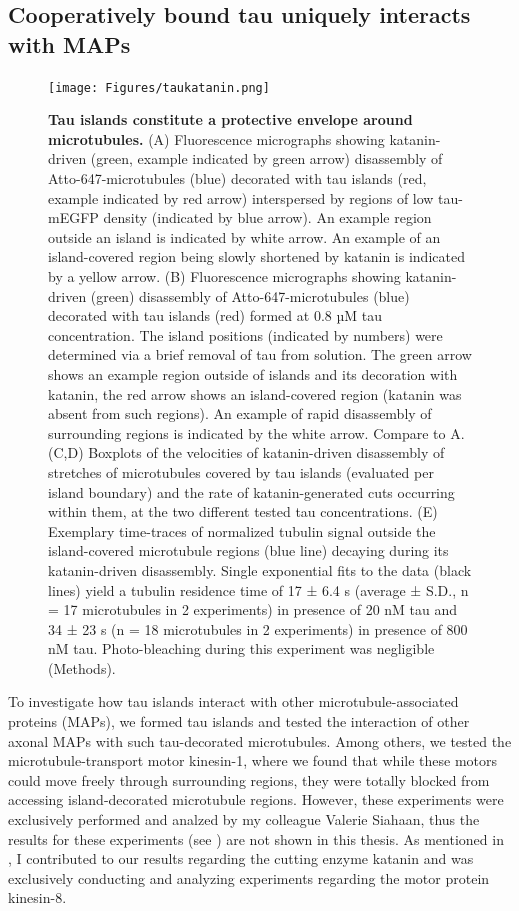 \subsection{Cooperatively bound tau uniquely interacts with MAPs}
\begin{figure}[h!]
\centering
\texttt{[image: Figures/taukatanin.png]}
\caption[Tau islands constitute a protective envelope around microtubules.]{
\textbf{Tau islands constitute a protective envelope around microtubules.} (A) Fluorescence micrographs showing katanin-driven (green, example indicated by green arrow) disassembly of Atto-647-microtubules (blue) decorated with tau islands (red, example indicated by red arrow) interspersed by regions of low tau-mEGFP density (indicated by blue arrow). An example region outside an island is indicated by white arrow. An example of an island-covered region being slowly shortened by katanin is indicated by a yellow arrow. (B) Fluorescence micrographs showing katanin-driven (green) disassembly of Atto-647-microtubules (blue) decorated with tau islands (red) formed at 0.8 µM tau concentration. The island positions (indicated by numbers) were determined via a brief removal of tau from solution. The green arrow shows an example region outside of islands and its decoration with katanin, the red arrow shows an island-covered region (katanin was absent from such regions). An example of rapid disassembly of surrounding regions is indicated by the white arrow. Compare to A. (C,D) Boxplots of the velocities of katanin-driven disassembly of stretches of microtubules covered by tau islands (evaluated per island boundary) and the rate of katanin-generated cuts occurring within them, at the two different tested tau concentrations. (E) Exemplary time-traces of normalized tubulin signal outside the island-covered microtubule regions (blue line) decaying during its katanin-driven disassembly. Single exponential fits to the data (black lines) yield a tubulin residence time of 17 ± 6.4 s (average ± S.D., n = 17 microtubules in 2 experiments) in presence of 20 nM tau and 34 ± 23 s (n = 18 microtubules in 2 experiments) in presence of 800 nM tau. Photo-bleaching during this experiment was negligible (Methods).
	}\label{taukatanin}
\end{figure}
To investigate how tau islands interact with other microtubule-associated proteins (MAPs), we formed tau islands and tested the interaction of other axonal MAPs with such tau-decorated microtubules. Among others, we tested the microtubule-transport motor kinesin-1, where we found that while these motors could move freely through surrounding regions, they were totally blocked from accessing island-decorated microtubule regions. However, these experiments were exclusively performed and analzed by my colleague Valerie Siahaan, thus the results for these experiments (see \cite{Siahaan2019a}) are not shown in this thesis. As mentioned in , I contributed to our results regarding the cutting enzyme katanin and was exclusively conducting and analyzing experiments regarding the motor protein kinesin-8.\par

